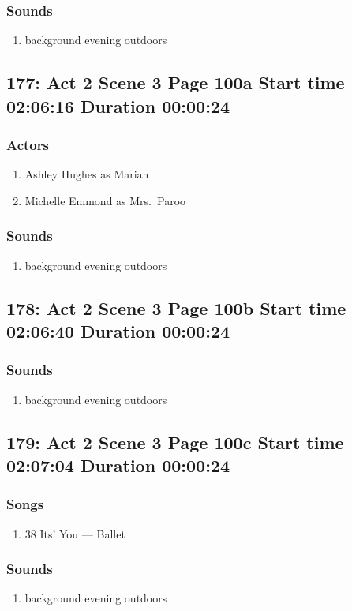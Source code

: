 \subsubsection{Sounds}
\begin{enumerate}
\item background evening outdoors
\end{enumerate}
\subsection{177: Act 2 Scene 3 Page 100a Start time 02:06:16 Duration 00:00:24}

\subsubsection{Actors}
\begin{enumerate}
\item Ashley Hughes as Marian
\item Michelle Emmond as Mrs.~Paroo
\end{enumerate}

\subsubsection{Sounds}
\begin{enumerate}
\item background evening outdoors
\end{enumerate}
\subsection{178: Act 2 Scene 3 Page 100b Start time 02:06:40 Duration 00:00:24}
\subsubsection{Sounds}
\begin{enumerate}
\item background evening outdoors
\end{enumerate}
\subsection{179: Act 2 Scene 3 Page 100c Start time 02:07:04 Duration 00:00:24}
\subsubsection{Songs}
\begin{enumerate}
\item 38 Its' You --- Ballet
\end{enumerate}\subsubsection{Sounds}
\begin{enumerate}
\item background evening outdoors
\end{enumerate}
